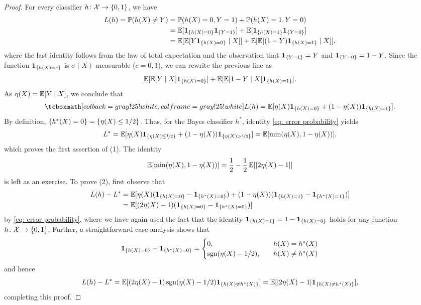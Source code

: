 \begin{proof}
For every classifier $h \colon \mathcal{X} \to \set{0, 1}$, we have
\begin{align*}
    L(h) = \Prob(h(X) \neq Y) &= \Prob(h(X) = 0, Y = 1) + \Prob(h(X) = 1, Y = 0) \\
    &= \Exp[\indSet{h(X) = 0} \indSet{Y = 1}] + \Exp[\indSet{h(X) = 1} \indSet{Y = 0}] \\
    &= \Exp[\Exp[Y \indSet{h(X) = 0} \given X]] + \Exp[\Exp[(1 - Y) \indSet{h(X) = 1} \given X]],
\end{align*}
where the last identity follows from the law of total expectation and the observation that $\indSet{Y = 1} = Y$ and $\indSet{Y = 0} = 1 - Y$. Since the function $\indSet{h(X) = c}$ is $\sigma(X)$-measurable ($c = 0, 1$), we can rewrite the previous line as
\[
    \Exp[\Exp[Y \given X] \indSet{h(X) = 0}] + \Exp[\Exp[1 - Y \given X] \indSet{h(X) = 1}].
\]
As $\eta(X) = \operatorname{\mathbb{E}}[Y \mathrel{|} X]$, we conclude that
\begin{equation}
    \label{eq: error probability}
    \highlightMath{
        L(h) = \Exp[\eta(X) \indSet{h(X) = 0} + (1 - \eta(X)) \indSet{h(X) = 1}].
    }
\end{equation}
By definition, $\set{h^*(X) = 0} = \set{\eta(X) \leq 1/2}$. Thus, for the Bayes classifier $h^*$, identity \eqref{eq: error probability} yields
\[
    L^* = \Exp[\eta(X) \indSet{\eta(X) \leq \nicefrac{1}{2}} + (1 - \eta(X)) \indSet{\eta(X) > \nicefrac{1}{2}}] = \Exp[\min(\eta(X), 1 - \eta(X))],
\]
which proves the first assertion of (1). The identity
\[
    \operatorname{\mathbb{E}}[\min(\eta(X), 1 - \eta(X))] = \frac{1}{2} - \frac{1}{2} \operatorname{\mathbb{E}}[\abs{2\eta(X) - 1 }]
\]
is left as an exercise. To prove (2), first observe that
\begin{align*}
    L(h) - L^* &= \Exp[\eta(X) (\indSet{h(X) = 0} - \indSet{h^*(X) = 0}) + (1 - \eta(X)) (\indSet{h(X) = 1} - \indSet{h^*(X) = 1})] \\
    &= \Exp[(2\eta(X) - 1) (\indSet{h(X) = 0} - \indSet{h^*(X) = 0})]
\end{align*}
by \eqref{eq: error probability}, where we have again used the fact that the identity $\indSet{h(X) = 1} = 1 - \indSet{h(X) = 0}$ holds for any function $h \colon \mathcal{X} \to \set{0, 1}$. Further, a straightforward case analysis shows that
\[
    \indSet{h(X) = 0} - \indSet{h^*(X) = 0} = \begin{cases}
        0, \quad & h(X) = h^*(X) \\
        \sgn(\eta(X) - 1/2), \quad & h(X) \neq h^*(X)
    \end{cases}
\]
and hence
\[
    L(h) - L^* = \Exp[(2\eta(X) - 1) \sgn(\eta(X) - 1/2) \indSet{h(X) \neq h^*(X)}] = \Exp[\abs{2\eta(X) - 1} \indSet{h(X) \neq h^*(X)}],
\]
completing this proof.
\end{proof}


